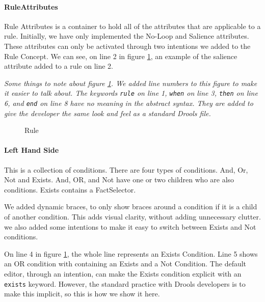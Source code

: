 \paragraph{RuleAttributes} Rule Attributes is a container to hold all of the attributes that are applicable to a rule.
Initially, we have only implemented the No-Loop and Salience attributes.
These attributes can only be activated through two intentions we added to the Rule Concept.
We can see, on line 2 in figure \ref{fig:Rule}, an example of the salience attribute added to a rule on line 2.

\emph{Some things to note about figure \ref{fig:Rule}.
We added line numbers to this figure to make it easier to talk about.
The keywords \texttt{rule} on line 1, \texttt{when} on line 3, \texttt{then} on line 6, and \texttt{end} on line 8 have no meaning in the abstract syntax.
They are added to give the developer the same look and feel as a standard Drools file.}

\begin{figure}[h]
    \centering
    \caption{Rule}
    \label{fig:Rule}
\end{figure}

\paragraph{Left Hand Side} This is a collection of conditions.
There are four types of conditions.
And, Or, Not and Exists.
And, OR, and Not have one or two children who are also conditions.
Exists contains a FactSelector.

We added dynamic braces, to only show braces around a condition if it is a child of another condition.
This adds visual clarity, without adding unnecessary clutter.
we also added some intentions to make it easy to switch between Exists and Not conditions.

On line 4 in figure \ref{fig:Rule}, the whole line represents an Exists Condition.
Line 5 shows an OR condition with containing an Exists and a Not Condition.
The default editor, through an intention, can make the Exists condition explicit with an \texttt{exists} keyword.
However, the standard practice with Drools developers is to make this implicit, so this is how we show it here.

